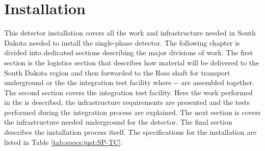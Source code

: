 \chapter{Installation}
\label{ch:sp-tc}

This  detector installation covers all the work and infrastructure needed in South Dakota needed to install the single-phase detector. 
The following chapter is divided into dedicated sections describing the major divisions of work. 
The first section is the logistics section that describes how material will be delivered to the South Dakota region and then forwarded to the Ross shaft for transport underground or the the integration test facility 
 where -- are assembled together. 
The second section covers the integration test facility. 
Here the work performed in the  is described, the infrastructure requirements are presented and the tests performed during the integration process are explained. 
The next section is covers the infrastructure needed underground for the detector. 
The final section describes the installation process itself. 
The specifications for the installation are listed in Table \ref{tab:specs:just:SP-TC}.


















 
 



